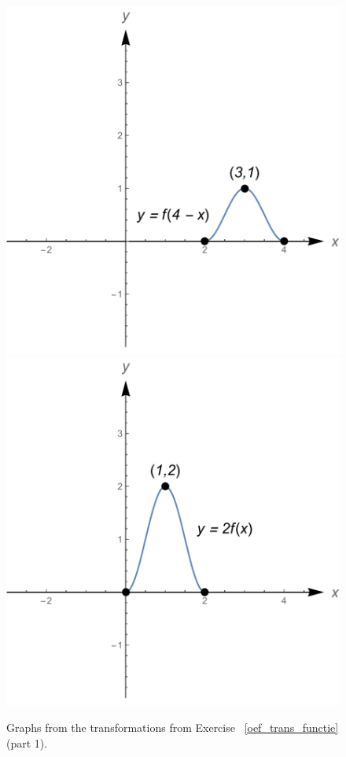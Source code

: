 \begin{Answer}
\begin{figure}[H]
{        }
        \vspace{0.3cm}
        \centerline{
        \includegraphics[scale=0.3]{fig_functions_oef_8g}
        \hspace{0.1cm}
        \includegraphics[scale=0.3]{fig_functions_oef_8h}
        }
        \caption{Graphs from the transformations from Exercise ~\ref{oef_trans_functie} (part 1).}
        \label{fig_oef_trans_functie_opl_deel1_NL}
    \end{figure}
    

\end{Answer}
